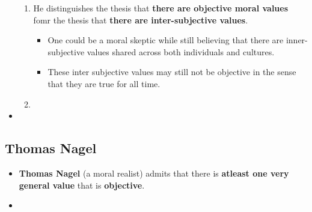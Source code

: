 \documentclass[16pt]{article}
\begin{document}
\begin{itemize}
\begin{enumerate}
            \item He distinguishes the thesis that \textbf{there are objective moral values} fomr the thesis that \textbf{there are inter-subjective values}.
            \begin{itemize}
                \item One could be a moral skeptic while still believing that there are inner-subjective values shared across both individuals and cultures.
                \item These inter subjective values may still not be objective in the sense that they are true for all time.
            \end{itemize}
            \item 
        \end{enumerate}
        \item 
    \end{itemize}

    \subsection*{Thomas Nagel}
    \begin{itemize}
        \item \textbf{Thomas Nagel} (a moral realist) admits that there is \textbf{atleast one very general value} that is \textbf{objective}.
        \item 
    \end{itemize}
\end{document}
